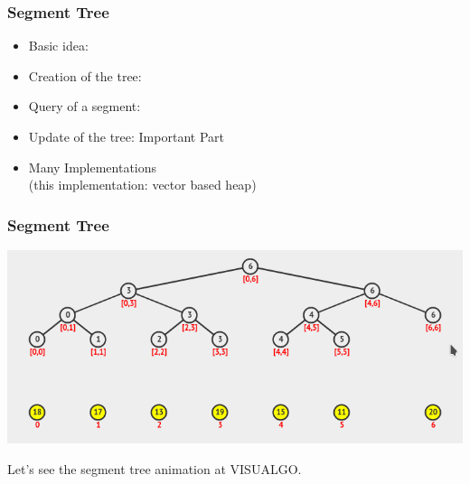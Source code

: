 \begin{frame}
  \frametitle{Segment Tree}

  \begin{itemize}
    \item Basic idea: 
    \bigskip

    \item Creation of the tree: 
    \bigskip

    \item Query of a segment: 
    \bigskip

    \item Update of the tree:  \hfill \alert{Important Part}
    \bigskip

    \item Many Implementations\\(this implementation: vector based heap)
  \end{itemize}
\end{frame}

\begin{frame}
  \frametitle{Segment Tree}
  \begin{center}
    \includegraphics[width=1\textwidth]{img/segment_tree}
  \end{center}

  \bigskip

  Let's see the segment tree animation at VISUALGO.
\end{frame}

